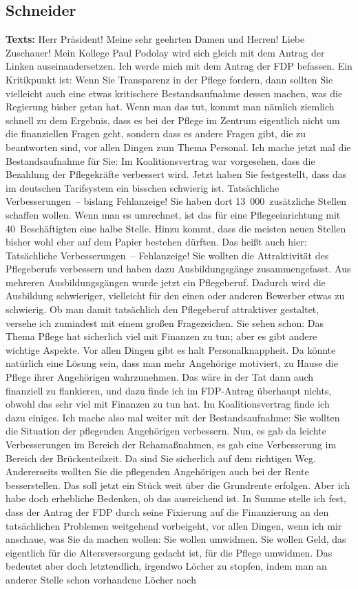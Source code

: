\documentclass{article}
\begin{document}
\subsection{Schneider}
\noindent\textbf{Texts:} Herr Präsident! Meine sehr geehrten Damen und Herren! Liebe Zuschauer! Mein Kollege Paul Podolay wird sich gleich mit dem Antrag der Linken auseinandersetzen. Ich werde mich mit dem Antrag der FDP befassen. Ein Kritikpunkt ist: Wenn Sie Transparenz in der Pflege fordern, dann sollten Sie vielleicht auch eine etwas kritischere Bestandsaufnahme dessen machen, was die Regierung bisher getan hat. Wenn man das tut, kommt man nämlich ziemlich schnell zu dem Ergebnis, dass es bei der Pflege im Zentrum eigentlich nicht um die finanziellen Fragen geht, sondern dass es andere Fragen gibt, die zu beantworten sind, vor allen Dingen zum Thema Personal. Ich mache jetzt mal die Bestandsaufnahme für Sie: Im Koalitionsvertrag war vorgesehen, dass die Bezahlung der Pflegekräfte verbessert wird. Jetzt haben Sie festgestellt, dass das im deutschen Tarifsystem ein bisschen schwierig ist. Tatsächliche Verbesserungen – bislang Fehlanzeige! Sie haben dort 13 000 zusätzliche Stellen schaffen wollen. Wenn man es umrechnet, ist das für eine Pflegeeinrichtung mit 40 Beschäftigten eine halbe Stelle.  Hinzu kommt, dass die meisten neuen Stellen bisher wohl eher auf dem Papier bestehen dürften. Das heißt auch hier: Tatsächliche Verbesserungen – Fehlanzeige! Sie wollten die Attraktivität des Pflegeberufs verbessern und haben dazu Ausbildungsgänge zusammengefasst. Aus mehreren Ausbildungsgängen wurde jetzt ein Pflegeberuf. Dadurch wird die Ausbildung schwieriger, vielleicht für den einen oder anderen Bewerber etwas zu schwierig. Ob man damit tatsächlich den Pflegeberuf attraktiver gestaltet, versehe ich zumindest mit einem großen Fragezeichen. Sie sehen schon: Das Thema Pflege hat sicherlich viel mit Finanzen zu tun; aber es gibt andere wichtige Aspekte. Vor allen Dingen gibt es halt Personalknappheit. Da könnte natürlich eine Lösung sein, dass man mehr Angehörige motiviert, zu Hause die Pflege ihrer Angehörigen wahrzunehmen.  Das wäre in der Tat dann auch finanziell zu flankieren, und dazu finde ich im FDP-Antrag überhaupt nichts, obwohl das sehr viel mit Finanzen zu tun hat. Im Koalitionsvertrag finde ich dazu einiges. Ich mache also mal weiter mit der Bestandsaufnahme: Sie wollten die Situation der pflegenden Angehörigen verbessern. Nun, es gab da leichte Verbesserungen im Bereich der Rehamaßnahmen, es gab eine Verbesserung im Bereich der Brückenteilzeit. Da sind Sie sicherlich auf dem richtigen Weg. Andererseits wollten Sie die pflegenden Angehörigen auch bei der Rente besserstellen. Das soll jetzt ein Stück weit über die Grundrente erfolgen. Aber ich habe doch erhebliche Bedenken, ob das ausreichend ist. In Summe stelle ich fest, dass der Antrag der FDP durch seine Fixierung auf die Finanzierung an den tatsächlichen Problemen weitgehend vorbeigeht, vor allen Dingen, wenn ich mir anschaue, was Sie da machen wollen: Sie wollen umwidmen. Sie wollen Geld, das eigentlich für die Altersversorgung gedacht ist, für die Pflege umwidmen. Das bedeutet aber doch letztendlich, irgendwo Löcher zu stopfen, indem man an anderer Stelle schon vorhandene Löcher noch 
\end{document}
